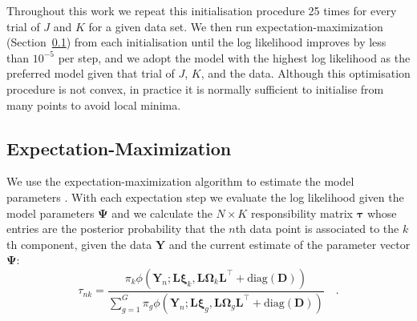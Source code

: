 \documentclass[twocolumn]{aastex62}
\newcommand{\vect}[1]{\boldsymbol{\mathbf{#1}}}
\renewcommand{\vec}[1]{\vect{#1}}
\newcommand{\weight}{\pi}
\newcommand{\data}{\textbf{Y}}
\newcommand{\vecdata}{\vec\data}
\newcommand{\diag}[1]{\textrm{diag}(#1)}
\newcommand{\transpose}{^\intercal}
\newcommand{\factorloads}{\textbf{L}}
\newcommand{\specificvariance}{\vec{D}}
\newcommand{\scoremeans}{\vec\xi}
\newcommand{\scorecovs}{\vec\Omega}
\newcommand{\NumData}{N}
\newcommand{\numdata}{n}
\newcommand{\NumLatentFactors}{J}
\newcommand{\NumComponents}{K}
\newcommand{\numcomponents}{k}
\begin{document}
Throughout this work we repeat this initialisation procedure 25 times for
every trial of $\NumLatentFactors$ and $\NumComponents$ for a given data set. 
We then run expectation-maximization (Section~\ref{sec:expectation-maximization})
from each initialisation until the log likelihood improves by less than $10^{-5}$
per step, and we adopt the model with the highest log likelihood as the preferred 
model given that trial of $\NumLatentFactors$, $\NumComponents$, and the data. Although
this optimisation procedure is not convex, in practice it is normally sufficient to
initialise from many points to avoid local minima.



\subsection{Expectation-Maximization} \label{sec:expectation-maximization}

We use the expectation-maximization algorithm to estimate the model parameters
\citep{Dempster:1977}. With each expectation step we evaluate the log likelihood 
given the model parameters $\vec\Psi$ and we calculate the $\NumData \times \NumComponents$ responsibility 
matrix $\vec\tau$ whose entries are the posterior probability that the 
$\numdata$th data point is associated to the $\numcomponents$th component, given 
the data $\vecdata$ and the current estimate of the parameter vector $\vec\Psi$:
\begin{equation}
	\tau_{\numdata\numcomponents} = \frac{\weight_\numcomponents\phi(\vecdata_\numdata;\factorloads\scoremeans_\numcomponents, \factorloads\scorecovs_\numcomponents\factorloads\transpose + \diag{\specificvariance})}{\sum_{g=1}^{G}\weight_g\phi(\vecdata_\numdata;\factorloads\scoremeans_g, \factorloads\scorecovs_g\factorloads\transpose + \diag{\specificvariance})} \quad .
\end{equation}
\end{document}
